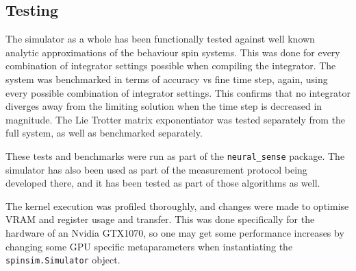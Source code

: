 \documentclass{jors}
\begin{document}

	\subsection*{Testing}
		The simulator as a whole has been functionally tested against well known analytic approximations of the behaviour spin systems. This was done for every combination of integrator settings possible when compiling the integrator. The system was benchmarked in terms of accuracy vs fine time step, again, using every possible combination of integrator settings. This confirms that no integrator diverges away from the limiting solution when the time step is decreased in magnitude. The Lie Trotter matrix exponentiator was tested separately from the full system, as well as benchmarked separately.

		These tests and benchmarks were run as part of the \texttt{neural\_sense} package. The simulator has also been used as part of the measurement protocol being developed there, and it has been tested as part of those algorithms as well.

		The kernel execution was profiled thoroughly, and changes were made to optimise VRAM and register usage and transfer. This was done specifically for the hardware of an Nvidia GTX1070, so one may get some performance increases by changing some GPU specific metaparameters when instantiating the \texttt{spinsim.Simulator} object.
\end{document}

